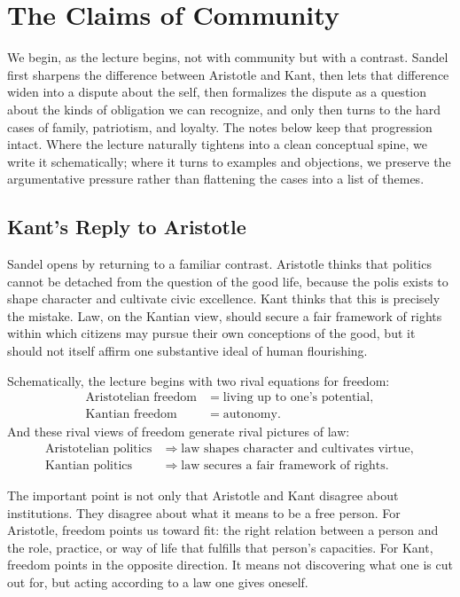 \chapter{The Claims of Community}

We begin, as the lecture begins, not with community but with a contrast. Sandel first sharpens the difference between Aristotle and Kant, then lets that difference widen into a dispute about the self, then formalizes the dispute as a question about the kinds of obligation we can recognize, and only then turns to the hard cases of family, patriotism, and loyalty. The notes below keep that progression intact. Where the lecture naturally tightens into a clean conceptual spine, we write it schematically; where it turns to examples and objections, we preserve the argumentative pressure rather than flattening the cases into a list of themes.

\section{Kant's Reply to Aristotle}

Sandel opens by returning to a familiar contrast. Aristotle thinks that politics cannot be detached from the question of the good life, because the polis exists to shape character and cultivate civic excellence. Kant thinks that this is precisely the mistake. Law, on the Kantian view, should secure a fair framework of rights within which citizens may pursue their own conceptions of the good, but it should not itself affirm one substantive ideal of human flourishing.

Schematically, the lecture begins with two rival equations for freedom:
\begin{align}
\text{Aristotelian freedom} &= \text{living up to one's potential}, \\
\text{Kantian freedom} &= \text{autonomy}.
\end{align}
And these rival views of freedom generate rival pictures of law:
\begin{align}
\text{Aristotelian politics} &\Longrightarrow \text{law shapes character and cultivates virtue}, \\
\text{Kantian politics} &\Longrightarrow \text{law secures a fair framework of rights}.
\end{align}

The important point is not only that Aristotle and Kant disagree about institutions. They disagree about what it means to be a free person. For Aristotle, freedom points us toward fit: the right relation between a person and the role, practice, or way of life that fulfills that person's capacities. For Kant, freedom points in the opposite direction. It means not discovering what one is cut out for, but acting according to a law one gives oneself.

